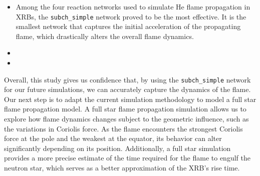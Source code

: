 \documentclass[preprint,times,tighten,linenumbers,trackchanges]{aastex631}
\begin{document}
\begin{itemize}
    \item  Among the four reaction networks used to simulate He flame propagation in XRBs, the {\tt subch\_simple} network proved to be the most effective. It is the smallest network that captures the initial acceleration of the propagating flame, which drastically alters the overall flame dynamics.
   
    
    \item {}

    \item {}
\end{itemize}

Overall, this study gives us confidence that, by using the {\tt subch\_simple} network for our future simulations, we can accurately capture the dynamics of the flame. Our next step is to adapt the current simulation methodology to model a full star flame propagation model. A full star flame propagation simulation allows us to explore how flame dynamics changes subject to the geometric influence, such as the variations in Coriolis force. As the flame encounters the strongest Coriolis force at the pole and the weakest at the equator, its behavior can alter significantly depending on its position. Additionally, a full star simulation provides a more precise estimate of the time required for the flame to engulf the neutron star, which serves as a better approximation of the XRB's rise time.



\end{document}
